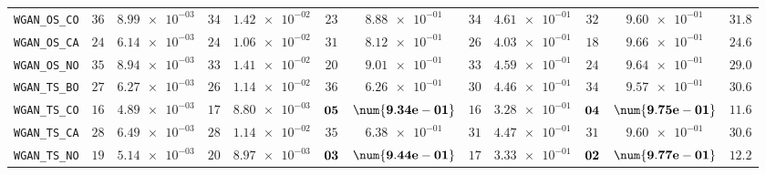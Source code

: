 \begin{table}[H]
\begin{tabularx}{\textwidth}{l||cC|cC|cC|cC|cC||c}
		\texttt{WGAN\_OS\_CO} & $ 36$ & $ \num{8.99e-03}$ & $ 34$ & $ \num{1.42e-02}$ & $ 23$ & $ \num{8.88e-01}$ & $ 34$ & $ \num{4.61e-01}$ & $ 32$ & $ \num{9.60e-01}$ & $ 31.8$  \\
		\texttt{WGAN\_OS\_CA} & $ 24$ & $ \num{6.14e-03}$ & $ 24$ & $ \num{1.06e-02}$ & $ 31$ & $ \num{8.12e-01}$ & $ 26$ & $ \num{4.03e-01}$ & $ 18$ & $ \num{9.66e-01}$ & $ 24.6$  \\
		\texttt{WGAN\_OS\_NO} & $ 35$ & $ \num{8.94e-03}$ & $ 33$ & $ \num{1.41e-02}$ & $ 20$ & $ \num{9.01e-01}$ & $ 33$ & $ \num{4.59e-01}$ & $ 24$ & $ \num{9.64e-01}$ & $ 29.0$  \\
		\texttt{WGAN\_TS\_BO} & $ 27$ & $ \num{6.27e-03}$ & $ 26$ & $ \num{1.14e-02}$ & $ 36$ & $ \num{6.26e-01}$ & $ 30$ & $ \num{4.46e-01}$ & $ 34$ & $ \num{9.57e-01}$ & $ 30.6$  \\
		\texttt{WGAN\_TS\_CO} & $ 16$ & $ \num{4.89e-03}$ & $ 17$ & $ \num{8.80e-03}$ & $\bf 05$ & $\bf \num{9.34e-01}$ & $ 16$ & $ \num{3.28e-01}$ & $\bf 04$ & $\bf \num{9.75e-01}$ & $ 11.6$  \\
		\texttt{WGAN\_TS\_CA} & $ 28$ & $ \num{6.49e-03}$ & $ 28$ & $ \num{1.14e-02}$ & $ 35$ & $ \num{6.38e-01}$ & $ 31$ & $ \num{4.47e-01}$ & $ 31$ & $ \num{9.60e-01}$ & $ 30.6$  \\
		\texttt{WGAN\_TS\_NO} & $ 19$ & $ \num{5.14e-03}$ & $ 20$ & $ \num{8.97e-03}$ & $\bf 03$ & $\bf \num{9.44e-01}$ & $ 17$ & $ \num{3.33e-01}$ & $\bf 02$ & $\bf \num{9.77e-01}$ & $ 12.2$  \\ \hline

\end{tabularx}
\end{table}
